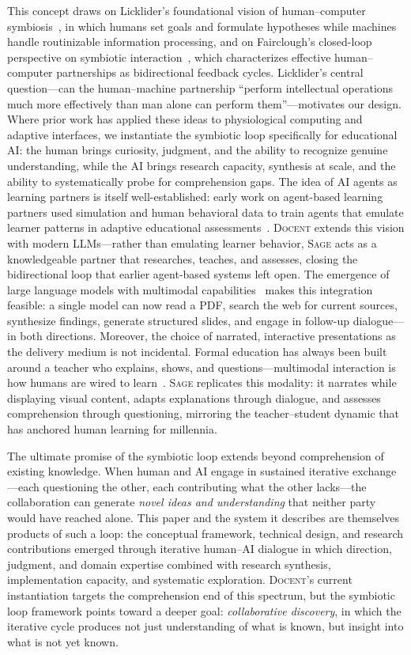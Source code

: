 \documentclass[11pt,a4paper]{article}
\newcommand{\system}{\textsc{Docent}\xspace}
\newcommand{\sage}{\textsc{Sage}\xspace}
\begin{document}
This concept draws on Licklider's foundational vision of human--computer symbiosis~\citep{licklider1960symbiosis}, in which humans set goals and formulate hypotheses while machines handle routinizable information processing, and on Fairclough's closed-loop perspective on symbiotic interaction~\citep{fairclough2015closedloop}, which characterizes effective human--computer partnerships as bidirectional feedback cycles.
Licklider's central question---can the human--machine partnership ``perform intellectual operations much more effectively than man alone can perform them''---motivates our design.
Where prior work has applied these ideas to physiological computing and adaptive interfaces, we instantiate the symbiotic loop specifically for educational AI: the human brings curiosity, judgment, and the ability to recognize genuine understanding, while the AI brings research capacity, synthesis at scale, and the ability to systematically probe for comprehension gaps.
The idea of AI agents as learning partners is itself well-established: early work on agent-based learning partners used simulation and human behavioral data to train agents that emulate learner patterns in adaptive educational assessments~\citep{sklar2009simulation}.
\system extends this vision with modern LLMs---rather than emulating learner behavior, \sage acts as a knowledgeable partner that researches, teaches, and assesses, closing the bidirectional loop that earlier agent-based systems left open.
The emergence of large language models with multimodal capabilities~\citep{openai2023gpt4, anthropic2024claude, team2023gemini} makes this integration feasible: a single model can now read a PDF, search the web for current sources, synthesize findings, generate structured slides, and engage in follow-up dialogue---in both directions.
Moreover, the choice of narrated, interactive presentations as the delivery medium is not incidental.
Formal education has always been built around a teacher who explains, shows, and questions---multimodal interaction is how humans are wired to learn~\citep{mayer2009multimedia}.
\sage replicates this modality: it narrates while displaying visual content, adapts explanations through dialogue, and assesses comprehension through questioning, mirroring the teacher--student dynamic that has anchored human learning for millennia.

The ultimate promise of the symbiotic loop extends beyond comprehension of existing knowledge.
When human and AI engage in sustained iterative exchange---each questioning the other, each contributing what the other lacks---the collaboration can generate \emph{novel ideas and understanding} that neither party would have reached alone.
This paper and the system it describes are themselves products of such a loop: the conceptual framework, technical design, and research contributions emerged through iterative human--AI dialogue in which direction, judgment, and domain expertise combined with research synthesis, implementation capacity, and systematic exploration.
\system's current instantiation targets the comprehension end of this spectrum, but the symbiotic loop framework points toward a deeper goal: \emph{collaborative discovery}, in which the iterative cycle produces not just understanding of what is known, but insight into what is not yet known.
\end{document}
